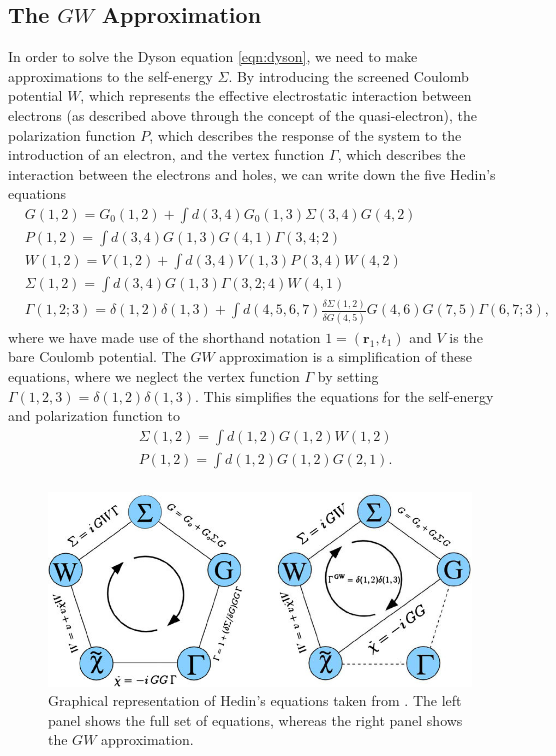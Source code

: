 \documentclass[12pt]{caltech_thesis}
\begin{document}
\subsection{The $GW$ Approximation}
In order to solve the Dyson equation \ref{eqn:dyson}, we need to make approximations to the self-energy $\Sigma$. By introducing the screened Coulomb potential $W$, which represents the effective electrostatic interaction between electrons (as described above through the concept of the quasi-electron), the polarization function $P$, which describes the response of the system to the introduction of an electron, and the vertex function $\Gamma$, which describes the interaction between the electrons and holes, we can write down the five Hedin's equations \autocite{Hedin1965}
\begin{equation}
\begin{aligned}
& G(1,2)=G_0(1,2)+\int d(3,4) G_0(1,3) \Sigma(3,4) G(4,2) \\
& P(1,2)=\int d(3,4) G(1,3) G(4,1) \Gamma(3,4 ; 2) \\
& W(1,2)=V(1,2)+\int d(3,4) V(1,3) P(3,4) W(4,2) \\
& \Sigma(1,2)=\int d(3,4) G(1,3) \Gamma(3,2 ; 4) W(4,1) \\
& \Gamma(1,2 ; 3)=\delta(1,2) \delta(1,3)+\int d(4,5,6,7) \frac{\delta \Sigma(1,2)}{\delta G(4,5)} G(4,6) G(7,5) \Gamma(6,7 ; 3),
\end{aligned}
\end{equation}
where we have made use of the shorthand notation $1=(\mathbf{r}_1, t_1)$ and $V$ is the bare Coulomb potential. The $GW$ approximation is a simplification of these equations, where we neglect the vertex function $\Gamma$ by setting $\Gamma (1,2,3)= \delta (1,2) \delta (1,3)$. This simplifies the equations for the self-energy and polarization function to
\begin{equation}
\begin{aligned}
& \Sigma(1,2)=\int d(1,2) G(1,2) W(1,2) \\
& P(1,2)=\int d(1,2) G(1,2) G(2,1). \\
\end{aligned}
\end{equation}
\begin{figure}
    \centering
    \includegraphics[width=\textwidth]{Left-panel-Graphical-representation-of-Hedins-equations-Right-panel-The-four-coupled.jpg}
    \caption{Graphical representation of Hedin's equations taken from \textcite{noauthor_frontiers_nodate}. The left panel shows the full set of equations, whereas the right panel shows the $GW$ approximation.}
    \label{fig:hedin}
\end{figure}
\end{document}
